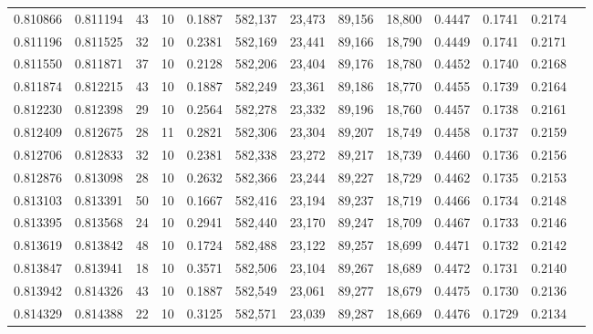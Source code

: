 \begin{tabular}{rrrrrrrrrrrrr}
0.810866 & 0.811194 &    43 &  10 &                                     0.1887 & 582,137 &  23,473 &  89,156 &  18,800 & 0.4447 & 0.1741 & 0.2174 \\
0.811196 & 0.811525 &    32 &  10 &                                     0.2381 & 582,169 &  23,441 &  89,166 &  18,790 & 0.4449 & 0.1741 & 0.2171 \\
0.811550 & 0.811871 &    37 &  10 &                                     0.2128 & 582,206 &  23,404 &  89,176 &  18,780 & 0.4452 & 0.1740 & 0.2168 \\
0.811874 & 0.812215 &    43 &  10 &                                     0.1887 & 582,249 &  23,361 &  89,186 &  18,770 & 0.4455 & 0.1739 & 0.2164 \\
0.812230 & 0.812398 &    29 &  10 &                                     0.2564 & 582,278 &  23,332 &  89,196 &  18,760 & 0.4457 & 0.1738 & 0.2161 \\
0.812409 & 0.812675 &    28 &  11 &                                     0.2821 & 582,306 &  23,304 &  89,207 &  18,749 & 0.4458 & 0.1737 & 0.2159 \\
0.812706 & 0.812833 &    32 &  10 &                                     0.2381 & 582,338 &  23,272 &  89,217 &  18,739 & 0.4460 & 0.1736 & 0.2156 \\
0.812876 & 0.813098 &    28 &  10 &                                     0.2632 & 582,366 &  23,244 &  89,227 &  18,729 & 0.4462 & 0.1735 & 0.2153 \\
0.813103 & 0.813391 &    50 &  10 &                                     0.1667 & 582,416 &  23,194 &  89,237 &  18,719 & 0.4466 & 0.1734 & 0.2148 \\
0.813395 & 0.813568 &    24 &  10 &                                     0.2941 & 582,440 &  23,170 &  89,247 &  18,709 & 0.4467 & 0.1733 & 0.2146 \\
0.813619 & 0.813842 &    48 &  10 &                                     0.1724 & 582,488 &  23,122 &  89,257 &  18,699 & 0.4471 & 0.1732 & 0.2142 \\
0.813847 & 0.813941 &    18 &  10 &                                     0.3571 & 582,506 &  23,104 &  89,267 &  18,689 & 0.4472 & 0.1731 & 0.2140 \\
0.813942 & 0.814326 &    43 &  10 &                                     0.1887 & 582,549 &  23,061 &  89,277 &  18,679 & 0.4475 & 0.1730 & 0.2136 \\
0.814329 & 0.814388 &    22 &  10 &                                     0.3125 & 582,571 &  23,039 &  89,287 &  18,669 & 0.4476 & 0.1729 & 0.2134 \\

\end{tabular}
